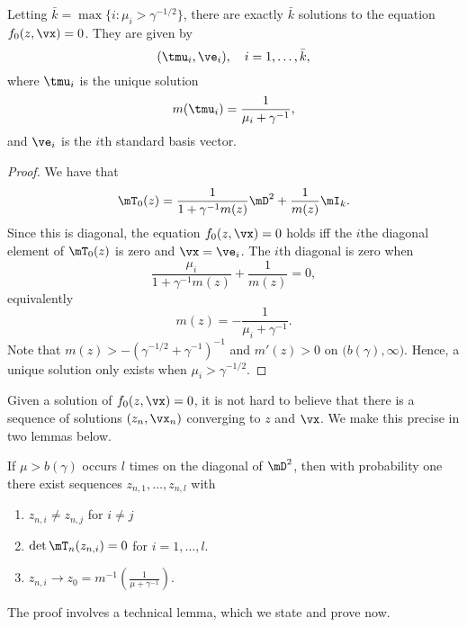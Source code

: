 \begin{lemma}
    Letting $\bar k = \max \{ i : \mu_i > \gamma^{-1/2} \}$, there are exactly
    $\bar k$ solutions to the equation $f_0( z, \vx ) = 0$.  They are given
    by
    \[
        ( \tmu_i, \ve_i ), \quad \text{$i = 1, \ldots, \bar k$},
    \]
    where $\tmu_i$ is the unique solution
    \[
        m( \tmu_i ) = \frac{1}{\mu_i + \gamma^{-1}},
    \]
    and $\ve_i$ is the $i$th standard basis vector.
\end{lemma}
\begin{proof}
    We have that 
    \[
        \mT_0(z) 
        = 
        \frac{1}{1 + \gamma^{-1} m(z)} \mD^2 
        + 
        \frac{1}{m(z)} \mI_k.
    \]
    Since this is diagonal, the equation $f_0(z, \vx) = 0$ holds iff the 
    $i$the diagonal element of $\mT_0(z)$ is zero and $\vx = \ve_i$.  The 
    $i$th diagonal is zero when 
    \[
        \frac{\mu_i}{1 + \gamma^{-1} m(z)} + \frac{1}{m(z)} = 0,
    \]
    equivalently
    \[
        m(z) = - \frac{1}{\mu_i + \gamma^{-1}}.
    \]
    Note that $m(z) > - \left( \gamma^{-1/2} + \gamma^{-1} \right)^{-1}$ and
    $m'(z) > 0$ on $\big( b(\gamma), \infty \big)$.  Hence, a unique solution
    only exists when $\mu_i > \gamma^{-1/2}$.
\end{proof}

Given a solution of $f_0(z, \vx) = 0$, it is not hard to believe that there is a sequence of solutions $(z_n, \vx_n)$ converging to $z$ and $\vx$.  We make this precise in two lemmas below.

\begin{lemma}\label{L:zn-sequence-exists}
    If $\mu > b(\gamma)$ occurs $l$ times on the diagonal of $\mD^2$, then
    with probability one there exist sequences $z_{n,1}, \ldots, z_{n,l}$
    with 
    \begin{enumerate}
        \item $z_{n,i} \neq z_{n,j}$ for $i \neq j$
        \item $\det \mT_n(z_{n,i}) = 0$ for $i = 1, \ldots, l$.
        \item $z_{n,i} \to 
                z_0 
                = 
                m^{-1} \left( \frac{1}{\mu + \gamma^{-1}} \right)$.
    \end{enumerate}
\end{lemma}

The proof involves a technical lemma, which we state and prove now.

